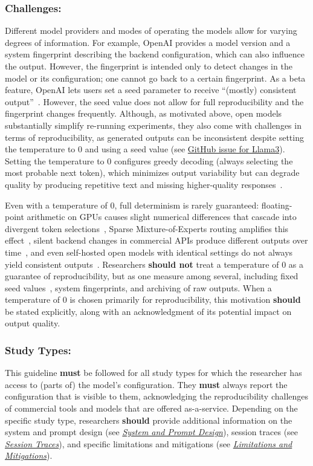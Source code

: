 \documentclass[smallextended]{svjour3}
\newcommand{\must}{\textbf{must}\xspace}
\newcommand{\should}{\textbf{should}\xspace}
\newcommand{\shouldnot}{\textbf{should not}\xspace}
\newcommand{\design}{\hyperref[sec:report-system-and-prompt-design]{\emph{System and Prompt Design}}\xspace}
\newcommand{\traces}{\hyperref[sec:report-session-traces]{\emph{Session Traces}}\xspace}
\newcommand{\limitationsmitigations}{\hyperref[sec:report-limitations-and-mitigations]{\emph{Limitations and Mitigations}}\xspace}
\newcommand{\design}{\href{/guidelines\#report-system-and-prompt-design}{\emph{System and Prompt Design}}\xspace}
\newcommand{\traces}{\href{/guidelines\#report-session-traces}{\emph{Session Traces}}\xspace}
\newcommand{\limitationsmitigations}{\href{/guidelines\#report-limitations-and-mitigations}{\emph{Limitations and Mitigations}}\xspace}
\newcommand{\guidelinesubsubsection}[1]{\subsubsection{\bfseries #1:}}
\newcommand{\guidelinesubsubsection}[1]{\subsubsection{#1}}
\begin{document}
\guidelinesubsubsection{Challenges}

Different model providers and modes of operating the models allow for varying degrees of information.
For example, OpenAI provides a model version and a system fingerprint describing the backend configuration, which can also influence the output.
However, the fingerprint is intended only to detect changes in the model or its configuration; one cannot go back to a certain fingerprint.
As a beta feature, OpenAI lets users set a seed parameter to receive ``(mostly) consistent output''~\cite{OpenAI23}.
However, the seed value does not allow for full reproducibility and the fingerprint changes frequently. 
Although, as motivated above, open models substantially simplify re-running experiments, they also come with challenges in terms of reproducibility, as generated outputs can be inconsistent despite setting the temperature to 0 and using a seed value (see \href{https://github.com/ollama/ollama/issues/5321}{GitHub issue for Llama3}).
Setting the temperature to 0 configures greedy decoding (always selecting the most probable next token), which minimizes output variability but can degrade quality by producing repetitive text and missing higher-quality responses~\cite{DBLP:conf/iclr/HoltzmanBDFC20}.

Even with a temperature of 0, full determinism is rarely guaranteed: floating-point arithmetic on GPUs causes slight numerical differences that cascade into divergent token selections~\cite{YuanNondeterminismLLMInference}, Sparse Mixture-of-Experts routing amplifies this effect~\cite{Chann2023}, silent backend changes in commercial APIs produce different outputs over time~\cite{DBLP:journals/corr/abs-2307-09009}, and even self-hosted open models with identical settings do not always yield consistent outputs~\cite{DBLP:journals/corr/abs-2510-25506, DBLP:conf/naacl/SongWLL25}.
Researchers \shouldnot treat a temperature of 0 as a guarantee of reproducibility, but as one measure among several, including fixed seed values~\cite{OpenAI23}, system fingerprints, and archiving of raw outputs.
When a temperature of 0 is chosen primarily for reproducibility, this motivation \should be stated explicitly, along with an acknowledgment of its potential impact on output quality.

\guidelinesubsubsection{Study Types}

This guideline \must be followed for all study types for which the researcher has access to (parts of) the model's configuration.
They \must always report the configuration that is visible to them, acknowledging the reproducibility challenges of commercial tools and models that are offered as-a-service.
Depending on the specific study type, researchers \should provide additional information on the system and prompt design (see \design), session traces (see \traces), and specific limitations and mitigations (see \limitationsmitigations).
\end{document}
